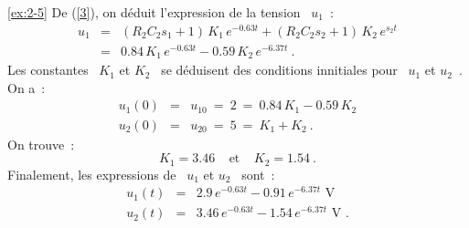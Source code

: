 \begin{solexercise}{\ref{ex:2-5}}
De (\ref{3}), on d\'eduit l'expression de la tension \ $u_1$~:
\begin{eqnarray*}
	u_1 &=& (R_2C_2s_1+1) \, K_1\, e^{-0.63t} + (R_2C_2s_2+1) \, K_2 \, e^{s_2t} \\
	&=& 0.84\, K_1 \, e^{-0.63t} - 0.59\, K_2\, e^{-6.37t}~. 
\end{eqnarray*}
Les constantes \ $K_1$ et $K_2$ \ se d\'eduisent des conditions innitiales pour \ $u_1$ et $u_2$~.
On a~:
\begin{eqnarray*}
	u_1(0) &=& u_{10} \: = \: 2 \: = \: 0.84\, K_1 - 0.59\, K_2\\
	u_2(0) &=& u_{20} \: = \: 5 \: = \: K_1 + K_2~.
\end{eqnarray*}
On trouve~:
\[ K_1 = 3.46 ~~~~~\mbox{et}~~~~~K_2 = 1.54~. \]
Finalement, les expressions de \ $u_1$ et $u_2$ \ sont~:
\begin{eqnarray*}
	u_1(t) &=& 2.9\, e^{-0.63t} - 0.91 \, e^{-6.37t}\mbox{~V}\\
	u_2(t) &=& 3.46\, e^{-0.63t} - 1.54 \, e^{-6.37t}\mbox{~V~.}
\end{eqnarray*}
\end{solexercise}

